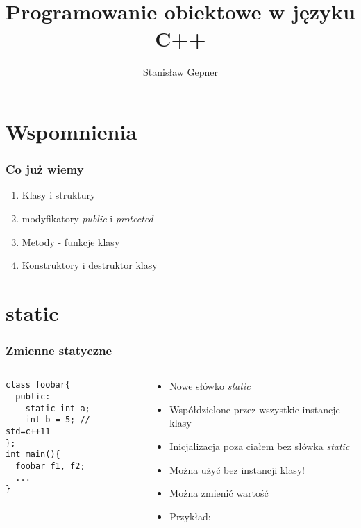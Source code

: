 \documentclass[10pt]{beamer}
\title{Programowanie obiektowe w języku C++}
\author[shortname]{Stanis{\l}aw Gepner}
\institute[shortinst]{sgepner@meil.pw.edu.pl}
\date{}
\begin{document}
\frame{
    \titlepage
}

\section{Wspomnienia}

\begin{frame}
  \frametitle{Co już wiemy}
  
  \centering
  \begin{enumerate}
    \item Klasy i struktury
    \item modyfikatory \textit{public} i \textit{protected}
    \item Metody - funkcje klasy
    \item Konstruktory i destruktor klasy
  \end{enumerate}
\end{frame}

\section{static}

\begin{frame}[fragile]
  \frametitle{Zmienne statyczne}
  \begin{columns}
    \begin{column}{0.48\textwidth}
\vspace{-0.2cm}
\begin{lstlisting}
class foobar{
  public:
    static int a;
    int b = 5; // -std=c++11
};
int main(){
  foobar f1, f2;
  ...
}
\end{lstlisting}
    \end{column}
    \begin{column}{0.48\textwidth}
      \begin{itemize}
        \item Nowe słówko \textit{static}
        \item Współdzielone przez wszystkie instancje klasy
        \item Inicjalizacja poza ciałem bez słówka \textit{static}
        \item Można użyć bez instancji klasy!
        \item Można zmienić wartość
        \item Przykład:
      \end{itemize}
    \end{column}
  \end{columns}
\end{frame}
\end{document}
